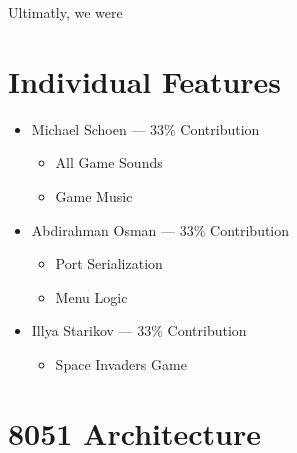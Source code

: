 \documentclass[12pt]{article}
\begin{document}
Ultimatly, we were


\section{Individual Features}
\begin{itemize}
    \item Michael Schoen --- 33\% Contribution
    \begin{itemize}
        \item All Game Sounds
        \item Game Music
    \end{itemize}

    \item Abdirahman Osman --- 33\% Contribution
    \begin{itemize}
        \item Port Serialization
        \item Menu Logic
    \end{itemize}

    \item Illya Starikov --- 33\% Contribution
    \begin{itemize}
        \item Space Invaders Game
    \end{itemize}
\end{itemize}

\section{8051 Architecture}
\end{document}
